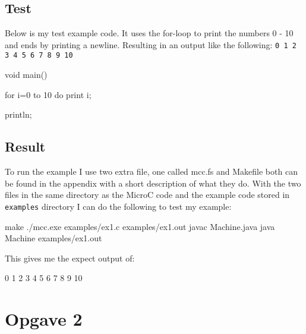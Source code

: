\subsection{Test}
Below is my test example code. It uses the for-loop to print the numbers 0 - 10
and ends by printing a newline. Resulting in an output like the following:
\texttt{0 1 2 3 4 5 6 7 8 9 10}
\begin{ccode}
void main() {
  for i=0 to 10 do 
    print i;

  println;
}
\end{ccode}
\subsection{Result}
To run the example I use two extra file, one called mcc.fs and Makefile both can
be found in the appendix with a short description of what they do. With the two
files in the same directory as the MicroC code and the example code stored in
\texttt{examples} directory I can do the following to test my example:
\begin{bashcode}
make
./mcc.exe examples/ex1.c examples/ex1.out
javac Machine.java
java Machine examples/ex1.out
\end{bashcode}
This gives me the expect output of:
\begin{bashcode}
0 1 2 3 4 5 6 7 8 9 10

\end{bashcode}

\section{Opgave 2}
